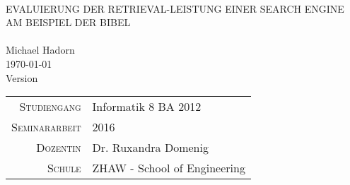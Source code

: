 




\begin{titlepage}
	\mbox{}\vspace{5\baselineskip}\\
	\rmfamily\huge
	\centering
	\textsc{EVALUIERUNG DER RETRIEVAL-LEISTUNG EINER SEARCH ENGINE AM BEISPIEL DER BIBEL} \\
	\mbox{}\vspace{1\baselineskip}\\
	Michael Hadorn\\
	\vspace{2\baselineskip}
	\rmfamily\Large
	\today\\
	Version \mbox{} \\
	\normalsize
	
	\vfill

	\begin{center}
		\begin{tabular}[h]{ r l }
			\textsc{\small{Studiengang}} & Informatik 8 BA 2012\\
			\textsc{\small{Seminararbeit}} & 2016\\
			\textsc{\small{Dozentin}} & Dr. Ruxandra Domenig\\
			\textsc{\small{Schule}} & ZHAW - School of Engineering\\
		\end{tabular}
	\end{center}

\end{titlepage}

 

